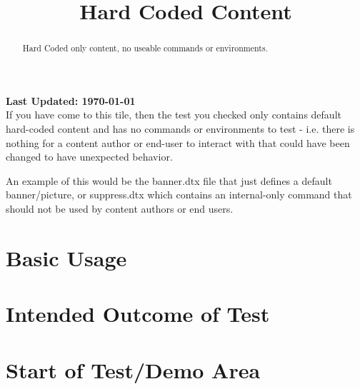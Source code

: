 \documentclass{ximera}
\title{Hard Coded Content}
\begin{document}
\begin{abstract}
    Hard Coded only content, no useable commands or environments.
\end{abstract}
\maketitle

{{\Huge \bfseries Last Updated: \today}} \\

If you have come to this tile, then the test you checked only contains default hard-coded content
and has no commands or environments to test - i.e. there is nothing for a content author or end-user to interact with that
could have been changed to have unexpected behavior. 

An example of this would be the banner.dtx file that just defines a default banner/picture, or suppress.dtx which
contains an internal-only command that should not be used by content authors or end users.


\section{Basic Usage}


\section{Intended Outcome of Test}


\section{Start of Test/Demo Area}



\hrulefill
\end{document}
